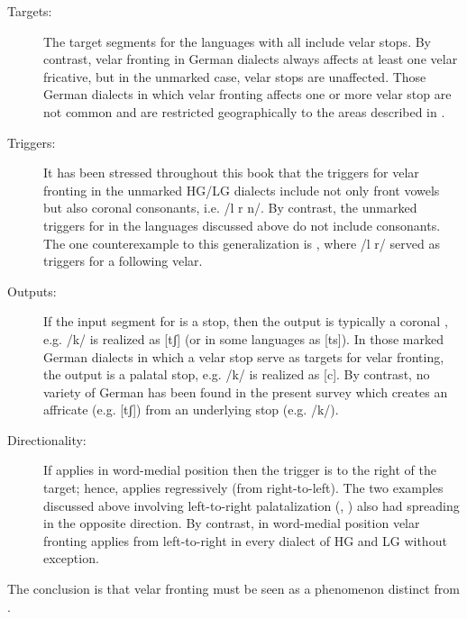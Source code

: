 \begin{description}
\item[Targets:] The target segments for the languages with  all include velar stops. By contrast, velar fronting in German dialects always affects at least one velar fricative, but in the unmarked case, velar stops are unaffected. Those German dialects in which velar fronting affects one or more velar stop are not common and are restricted geographically to the areas described in .

\item[Triggers:] It has been stressed throughout this book that the triggers for velar fronting in the unmarked HG/LG dialects include not only front vowels but also coronal consonants, i.e. /l r n/. By contrast, the unmarked triggers for  in the languages discussed above do not include consonants. The one counterexample to this generalization is , where /l r/ served as triggers for a following velar.

\item[Outputs:] If the input segment for  is a stop, then the output is typically a coronal , e.g. /k/ is realized as [tʃ] (or in some languages as [ts]). In those marked German dialects in which a velar stop serve as targets for velar fronting, the output is a palatal stop, e.g. /k/ is realized as [c]. By contrast, no variety of German has been found in the present survey which creates an affricate (e.g. [tʃ]) from an underlying stop (e.g. /k/).

\item[Directionality:] If  applies in word-medial position then the trigger is to the right of the target; hence,  applies regressively (from right-to-left). The two examples discussed above involving left-to-right palatalization (, ) also had spreading in the opposite direction. By contrast, in word-medial position velar fronting applies from left-to-right in every dialect of HG and LG without exception.
\end{description}

The conclusion is that velar fronting must be seen as a phenomenon distinct from .
